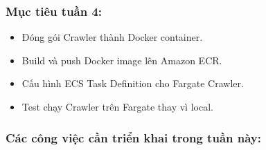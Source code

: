 \hypertarget{mux1ee5c-tiuxeau-tuux1ea7n-4}{%
\subsubsection{Mục tiêu tuần 4:}}

\begin{itemize}
\tightlist
\item
  Đóng gói Crawler thành Docker container.
\item
  Build và push Docker image lên Amazon ECR.
\item
  Cấu hình ECS Task Definition cho Fargate Crawler.
\item
  Test chạy Crawler trên Fargate thay vì local.
\end{itemize}

\hypertarget{cuxe1c-cuxf4ng-viux1ec7c-cux1ea7n-triux1ec3n-khai-trong-tuux1ea7n-nuxe0y}{%
\subsubsection{Các công việc cần triển khai trong tuần
này:}}


